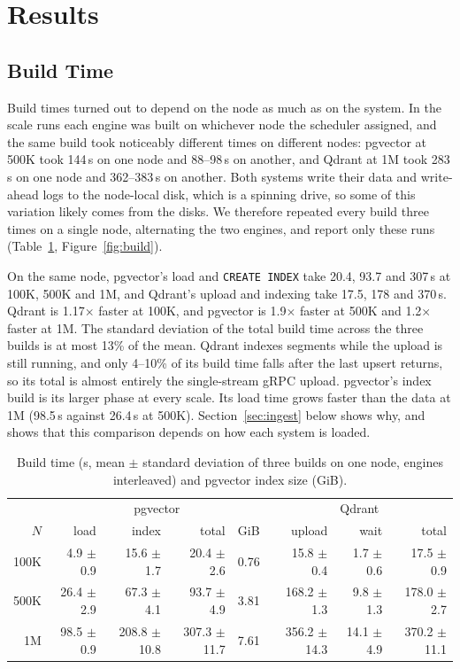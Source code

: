 \documentclass[preprint,12pt]{elsarticle}
\begin{document}
\section{Results}

\subsection{Build Time}
\label{sec:build}

Build times turned out to depend on the node as much as on the system. In the scale
runs each engine was built on whichever node the scheduler assigned, and the same
build took noticeably different times on different nodes: pgvector at 500K took 144\,s
on one node and 88--98\,s on another, and Qdrant at 1M took 283\,s on one node and
362--383\,s on another. Both systems write their data and write-ahead logs to the
node-local disk, which is a spinning drive, so some of this variation likely comes from
the disks. We therefore repeated every build three times on a single node, alternating
the two engines, and report only these runs (Table~\ref{tab:build},
Figure~\ref{fig:build}).

On the same node, pgvector's load and \texttt{CREATE INDEX} take 20.4, 93.7 and 307\,s
at 100K, 500K and 1M, and Qdrant's upload and indexing take 17.5, 178 and 370\,s. Qdrant
is 1.17$\times$ faster at 100K, and pgvector is 1.9$\times$ faster at 500K and
1.2$\times$ faster at 1M. The standard deviation of the total build time across the three
builds is at most 13\% of the mean. Qdrant indexes segments while the upload is still running, and only
4--10\% of its build time falls after the last upsert returns, so its total is almost
entirely the single-stream gRPC upload. pgvector's index build is its larger phase at
every scale. Its load time grows faster than the data at 1M (98.5\,s against 26.4\,s at
500K). Section~\ref{sec:ingest} below shows why, and shows that this comparison depends on how
each system is loaded.

\begin{table}[t]
  \caption{Build time (s, mean $\pm$ standard deviation of three builds on one node,
  engines interleaved) and pgvector index size (GiB).}
  \label{tab:build}
  \small
  \begin{tabular}{r|rrrr|rrr}
    \toprule
     & \multicolumn{4}{c|}{pgvector} & \multicolumn{3}{c}{Qdrant} \\
    $N$ & load & index & total & GiB & upload & wait & total \\
    \midrule
    100K & 4.9 $\pm$ 0.9 & 15.6 $\pm$ 1.7 & 20.4 $\pm$ 2.6 & 0.76 & 15.8 $\pm$ 0.4 & 1.7 $\pm$ 0.6 & 17.5 $\pm$ 0.9 \\
    500K & 26.4 $\pm$ 2.9 & 67.3 $\pm$ 4.1 & 93.7 $\pm$ 4.9 & 3.81 & 168.2 $\pm$ 1.3 & 9.8 $\pm$ 1.3 & 178.0 $\pm$ 2.7 \\
    1M & 98.5 $\pm$ 0.9 & 208.8 $\pm$ 10.8 & 307.3 $\pm$ 11.7 & 7.61 & 356.2 $\pm$ 14.3 & 14.1 $\pm$ 4.9 & 370.2 $\pm$ 11.1 \\
    \bottomrule
  \end{tabular}
\end{table}
\end{document}
